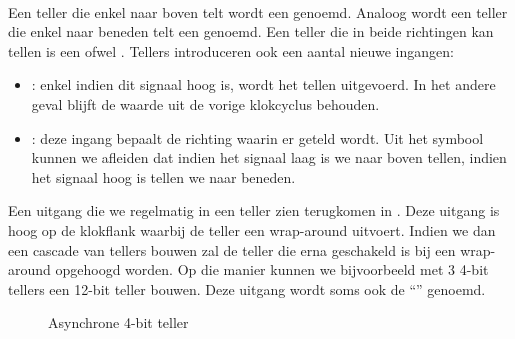 \paragraph{}
Een teller die enkel naar boven telt wordt een  genoemd. Analoog wordt een teller die enkel naar beneden telt een  genoemd. Een teller die in beide richtingen kan tellen is een  ofwel . Tellers introduceren ook een aantal nieuwe ingangen:
\begin{itemize}
 \item {}: enkel indien dit signaal hoog is, wordt het tellen uitgevoerd. In het andere geval blijft de waarde uit de vorige klokcyclus behouden.
 \item {}: deze ingang bepaalt de richting waarin er geteld wordt. Uit het symbool kunnen we afleiden dat indien het signaal laag is we naar boven tellen, indien het signaal hoog is tellen we naar beneden.
\end{itemize}
Een uitgang die we regelmatig in een teller zien terugkomen in . Deze uitgang is hoog op de klokflank waarbij de teller een wrap-around uitvoert. Indien we dan een cascade van tellers bouwen zal de teller die erna geschakeld is bij een wrap-around opgehoogd worden. Op die manier kunnen we bijvoorbeeld met 3 4-bit tellers een 12-bit teller bouwen. Deze uitgang wordt soms ook de ``'' genoemd.
\begin{figure}[hbt]
\centering
{}
\caption{Asynchrone 4-bit teller}
\end{figure}
